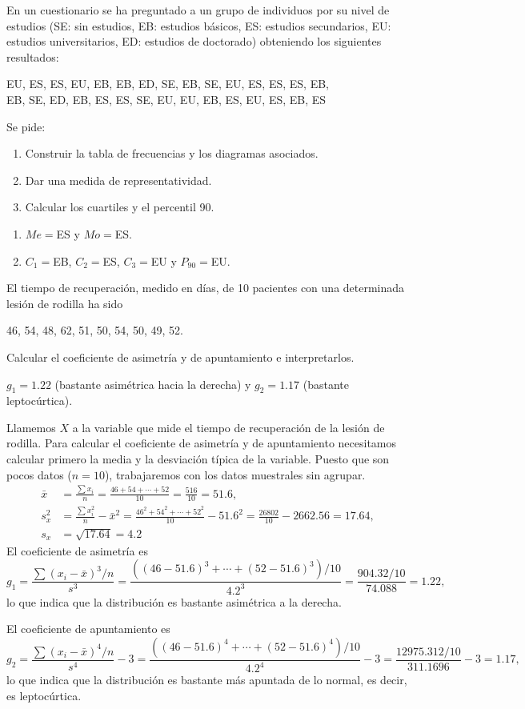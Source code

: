 {En un cuestionario se ha preguntado a un grupo de individuos por su nivel de estudios (SE: sin estudios, EB: estudios básicos, ES: estudios secundarios, EU: estudios universitarios, ED: estudios de doctorado) obteniendo los siguientes resultados:
\begin{center}
EU, ES, ES, EU, EB, EB, ED, SE, EB, SE, EU, ES, ES, ES, EB,\\
EB, SE, ED, EB, ES, ES, SE, EU, EU, EB, ES, EU, ES, EB, ES
\end{center}
Se pide:
\begin{enumerate}
\item Construir la tabla de frecuencias y los diagramas asociados.
\item Dar una medida de representatividad.
\item Calcular los cuartiles y el percentil 90.
\end{enumerate}
}
{\begin{enumerate}[start=2]
\item $Me=$ES y $Mo=$ES.
\item $C_1=$EB, $C_2=$ES, $C_3=$EU y $P_{90}=$EU.
\end{enumerate}
}
{}


{El tiempo de recuperación, medido en días, de 10 pacientes con una determinada lesión de rodilla ha sido
\begin{center}
46, 54, 48, 62, 51, 50, 54, 50, 49, 52.
\end{center}
Calcular el coeficiente de asimetría y de apuntamiento e interpretarlos.
}
{$g_1=1.22$ (bastante asimétrica hacia la derecha) y $g_2=1.17$ (bastante leptocúrtica).}
{Llamemos $X$ a la variable que mide el tiempo de recuperación de la lesión de rodilla.
Para calcular el coeficiente de asimetría y de apuntamiento necesitamos calcular primero la media y la desviación típica de la variable. Puesto que son pocos datos ($n=10$), trabajaremos con los datos muestrales sin agrupar.
\begin{align*}
\bar x &= \frac{\sum x_i}{n}=\frac{46+54+\cdots+52}{10}=\frac{516}{10}=51.6,\\
s_x^2 &= \frac{\sum x_i^2}{n}-\bar x^2=\frac{46^2+54^2+\cdots+52^2}{10}-51.6^2=\frac{26802}{10}-2662.56=17.64,\\
s_x &= \sqrt{17.64}=4.2
\end{align*}
El coeficiente de asimetría es
\[ g_1=\frac{\sum(x_i-\bar x)^3/n}{s^3}= \frac{((46-51.6)^3+\cdots+(52-51.6)^3)/10}{4.2^3}=\frac{904.32/10}{74.088}=1.22,
\]
lo que indica que la distribución es bastante asimétrica a la derecha.

El coeficiente de apuntamiento es
\[ g_2=\frac{\sum(x_i-\bar x)^4/n}{s^4}-3= \frac{((46-51.6)^4+\cdots+(52-51.6)^4)/10}{4.2^4}-3=\frac{12975.312/10}{311.1696}-3=1.17,
\]
lo que indica que la distribución es bastante más apuntada de lo normal, es decir, es leptocúrtica.
}


